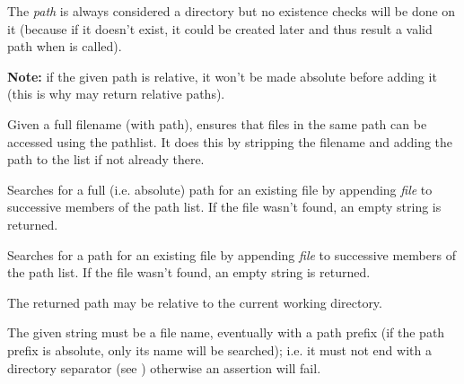 The {\it path} is always considered a directory but no existence checks will be done on it
(because if it doesn't exist, it could be created later and thus result a valid path when
 is called).

{\bf Note:} if the given path is relative, it won't be made absolute before adding it
(this is why  may return relative paths).


\label{wxpathlistensurefileaccessible}


Given a full filename (with path), ensures that files in the same path
can be accessed using the pathlist. It does this by stripping the
filename and adding the path to the list if not already there.


\label{wxpathlistfindabsolutepath}


Searches for a full (i.e. absolute) path for an existing file by appending {\it file} to
successive members of the path list.  If the file wasn't found, an empty
string is returned.


\label{wxpathlistfindvalidpath}


Searches for a path for an existing file by appending {\it file} to
successive members of the path list.
If the file wasn't found, an empty string is returned.

The returned path may be relative to the current working directory.

The given string must be a file name, eventually with a path prefix (if the path
prefix is absolute, only its name will be searched); i.e. it must not end with
a directory separator (see )
otherwise an assertion will fail.

